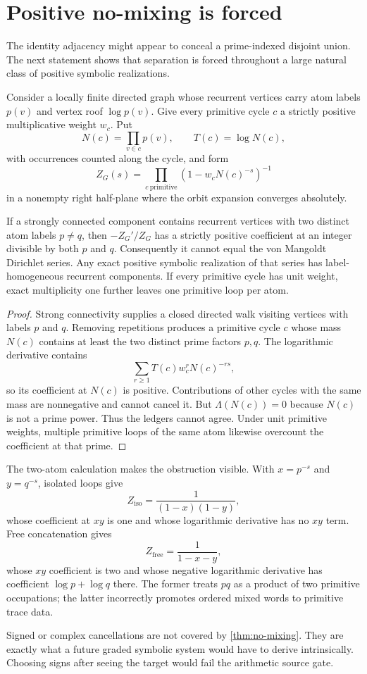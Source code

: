 \section{Positive no-mixing is forced}
\label{sec:no-mixing}

The identity adjacency might appear to conceal a prime-indexed disjoint
union.  The next statement shows that separation is forced throughout a
large natural class of positive symbolic realizations.

Consider a locally finite directed graph whose recurrent vertices carry atom
labels $p(v)$ and vertex roof $\log p(v)$.  Give every primitive cycle $c$ a
strictly positive multiplicative weight $w_c$.  Put
\[
  N(c)=\prod_{v\in c}p(v),\qquad T(c)=\log N(c),
\]
with occurrences counted along the cycle, and form
\[
 Z_G(s)=\prod_{c\ \mathrm{primitive}}
       (1-w_cN(c)^{-s})^{-1}
\]
in a nonempty right half-plane where the orbit expansion converges
absolutely.

\begin{theorem}
\label{thm:no-mixing}
If a strongly connected component contains recurrent vertices with two
distinct atom labels $p\neq q$, then $-Z_G'/Z_G$ has a strictly positive
coefficient at an integer divisible by both $p$ and $q$.  Consequently it
cannot equal the von Mangoldt Dirichlet series.  Any exact positive symbolic
realization of that series has label-homogeneous recurrent components.
If every primitive cycle has unit weight, exact multiplicity one further
leaves one primitive loop per atom.
\end{theorem}

\begin{proof}
Strong connectivity supplies a closed directed walk visiting vertices with
labels $p$ and $q$.  Removing repetitions produces a primitive cycle $c$
whose mass $N(c)$ contains at least the two distinct prime factors $p,q$.
The logarithmic derivative contains
\[
 \sum_{r\geq1}T(c)w_c^rN(c)^{-rs},
\]
so its coefficient at $N(c)$ is positive.  Contributions of other cycles
with the same mass are nonnegative and cannot cancel it.  But
$\Lambda(N(c))=0$ because $N(c)$ is not a prime power.  Thus the ledgers
cannot agree.  Under unit primitive weights, multiple primitive loops of the
same atom likewise overcount the coefficient at that prime.
\end{proof}

The two-atom calculation makes the obstruction visible.  With
$x=p^{-s}$ and $y=q^{-s}$, isolated loops give
\[
 Z_{\mathrm{iso}}=\frac1{(1-x)(1-y)},
\]
whose coefficient at $xy$ is one and whose logarithmic derivative has no
$xy$ term.  Free concatenation gives
\[
 Z_{\mathrm{free}}=\frac1{1-x-y},
\]
whose $xy$ coefficient is two and whose negative logarithmic derivative has
coefficient $\log p+\log q$ there.  The former treats $pq$ as a product of
two primitive occupations; the latter incorrectly promotes ordered mixed
words to primitive trace data.

Signed or complex cancellations are not covered by
\cref{thm:no-mixing}.  They are exactly what a future graded symbolic system
would have to derive intrinsically.  Choosing signs after seeing the target
would fail the arithmetic source gate.
